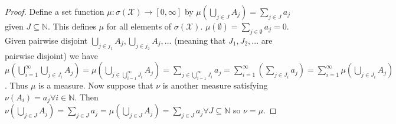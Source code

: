 \documentclass{article}
\begin{document}
\begin{proof}
Define a set function $\mu:\sigma(\mathcal{X})\to[0,\infty]$ by $\mu(\bigcup_{j\in J}A_j)=\sum_{j\in J}a_j$ given $J\subseteq\mathbb{N}$. This defines $\mu$ for all elements of $\sigma(\mathcal{X})$. $\mu(\emptyset)=\sum_{j\in\emptyset}a_j=0$. Given pairwise disjoint $\bigcup_{j\in j_1}A_j,\bigcup_{j\in j_2}A_j,...$ (meaning that $J_1,J_2,...$ are pairwise disjoint) we have $\mu(\bigcup_{i=1}^\infty\bigcup_{j\in J_i}A_j)=\mu(\bigcup_{j\in\bigcup_{i=1}^\infty J_i}A_j)=\sum_{j\in\bigcup_{i=1}^\infty J_i}a_j=\sum_{i=1}^\infty(\sum_{j\in J_i}a_j)=\sum_{i=1}^\infty\mu(\bigcup_{j\in J_i}A_j)$. Thus $\mu$ is a measure. Now suppose that $\nu$ is another measure satisfying $\nu(A_i)=a_j\forall i\in\mathbb{N}$. Then $\nu(\bigcup_{j\in J}A_j)=\sum_{j\in J}a_j=\mu(\bigcup_{j\in J}A_j)=\sum_{j\in J}a_j\forall J\subseteq\mathbb{N}$ so $\nu=\mu$.
\end{proof}
\end{document}

